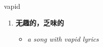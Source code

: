 
\begin{frame}
{\huge vapid}
\begin{center}
\begin{enumerate}\Large
  \item \textbf{无趣的，乏味的}
  \begin{itemize}
    \item \em{\Large{a song with vapid lyrics}}
  \end{itemize}
\end{enumerate}
\end{center}
\end{frame}
